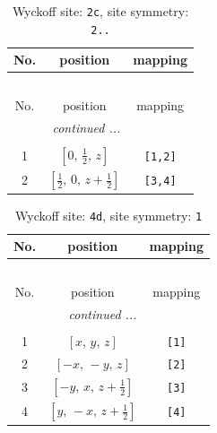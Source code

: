 \documentclass[fleqn,8pt]{jsarticle}
\begin{document}
\begin{longtable}{ccc}
\caption{Wyckoff site: {\tt 2c}, site symmetry: {\tt 2..}}
 \\
 \hline \hline
No. & position & mapping \\ \hline \endfirsthead

\multicolumn{2}{l}{\tablename\ \thetable{}} \\
 \hline \hline
No. & position & mapping \\ \hline \endhead

 \hline \hline
\multicolumn{2}{r}{\footnotesize\it continued ...} \\ \endfoot

 \hline \hline
\multicolumn{2}{r}{} \\ \endlastfoot

1 & $\left[ 0,\, \frac{1}{2},\, z \right]$ & {\tt [1,2]} \\ \hline
2 & $\left[ \frac{1}{2},\, 0,\, z + \frac{1}{2} \right]$ & {\tt [3,4]} \\
\end{longtable}
\renewcommand{\arraystretch}{1.2}
\begin{longtable}{ccc}
\caption{Wyckoff site: {\tt 4d}, site symmetry: {\tt 1}}
 \\
 \hline \hline
No. & position & mapping \\ \hline \endfirsthead

\multicolumn{2}{l}{\tablename\ \thetable{}} \\
 \hline \hline
No. & position & mapping \\ \hline \endhead

 \hline \hline
\multicolumn{2}{r}{\footnotesize\it continued ...} \\ \endfoot

 \hline \hline
\multicolumn{2}{r}{} \\ \endlastfoot

1 & $\left[ x,\, y,\, z \right]$ & {\tt [1]} \\ \hline
2 & $\left[ - x,\, - y,\, z \right]$ & {\tt [2]} \\ \hline
3 & $\left[ - y,\, x,\, z + \frac{1}{2} \right]$ & {\tt [3]} \\ \hline
4 & $\left[ y,\, - x,\, z + \frac{1}{2} \right]$ & {\tt [4]} \\
\end{longtable}
\end{document}
